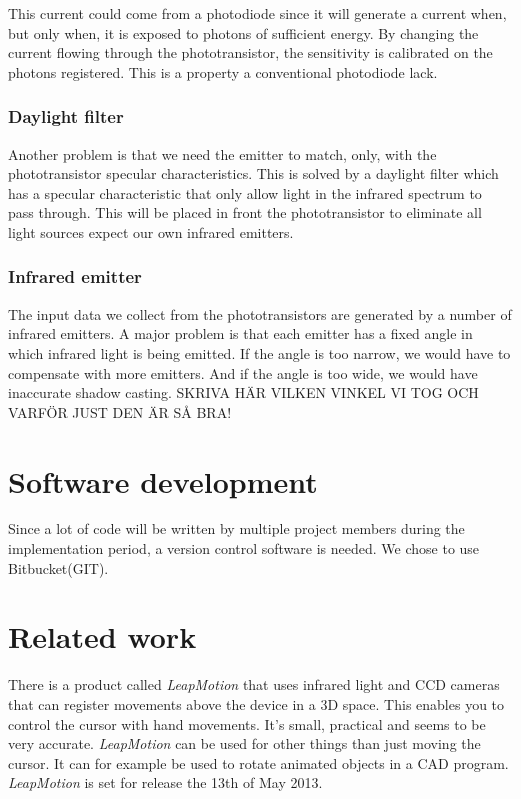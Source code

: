 This current could come from a photodiode since it will generate a current when, 
but only when, it is exposed to photons of sufficient energy. By changing the current 
flowing through the phototransistor, the sensitivity is calibrated on the photons 
registered. This is a property a conventional photodiode lack.

\subsubsection{Daylight filter}
Another problem is that we need the emitter to match, only, with the phototransistor 
specular characteristics. This is solved by a daylight filter which has a specular 
characteristic that only allow light in the infrared spectrum to pass through. This 
will be placed in front the phototransistor to eliminate all light sources expect our 
own infrared emitters.

\subsubsection{Infrared emitter}
The input data we collect from the phototransistors are generated by a number of infrared 
emitters. A major problem is that each emitter has a fixed angle in which infrared light is 
being emitted. If the angle is too narrow, we would have to compensate with more emitters. 
And if the angle is too wide, we would have inaccurate shadow casting. 
SKRIVA HÄR VILKEN VINKEL VI TOG OCH VARFÖR JUST DEN ÄR SÅ BRA!

\section{Software development}
Since a lot of code will be written by multiple project members during the 
implementation period,  a version control software is needed. We chose to use Bitbucket(GIT).

\section{Related work}
There is a product called \emph{LeapMotion} that uses infrared light and CCD cameras that can
register movements above the device in a 3D space. This enables you to control the cursor with
hand movements. It's small, practical and seems to be very accurate. \emph{LeapMotion} can be
used for other things than just moving the cursor. It can for example be used to rotate animated
objects in a CAD program.\\
\emph{LeapMotion} is set for release the 13th of May 2013.

